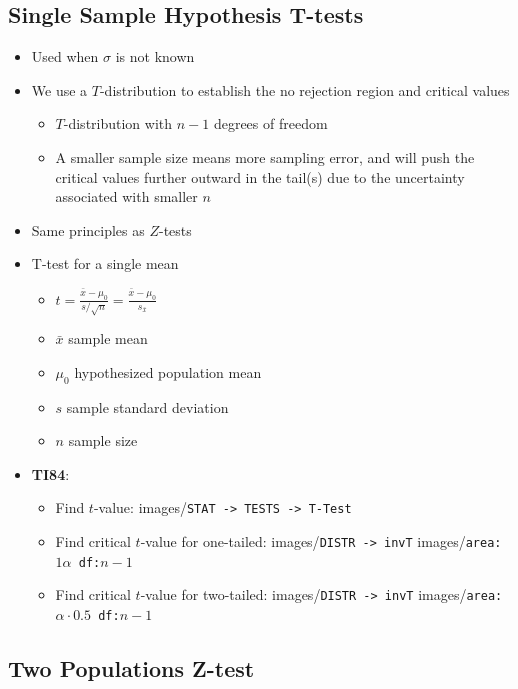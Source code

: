 \documentclass{article}
\newcommand{\code}[1]{images/\colorbox{light-gray}{\texttt{#1}}}
\begin{document}
\subsection{Single Sample Hypothesis T-tests}

\begin{itemize}
    \item Used when $\sigma$ is not known
    \item We use a $T$-distribution to establish the no rejection region and critical values
    \begin{itemize}
        \item $T$-distribution with $n-1$ degrees of freedom
        \item A smaller sample size means more sampling error, and will push the critical values further outward in the tail(s) due to the uncertainty associated with smaller $n$
    \end{itemize}
    \item Same principles as $Z$-tests
    \item T-test for a single mean
    \begin{itemize}
        \item $t=\frac{\bar{x} - \mu_0}{s / \sqrt{n}}=\frac{\bar{x} - \mu_0}{s_{\bar{x}}}$
        \item $\bar{x}$ sample mean
        \item $\mu_0$ hypothesized population mean
        \item $s$ sample standard deviation
        \item $n$ sample size
    \end{itemize}
    \item \textbf{TI84}:
    \begin{itemize}
        \item Find $t$-value: \code{STAT -> TESTS -> T-Test}
        \item Find critical $t$-value for one-tailed: \code{DISTR -> invT} \code{area:$1\alpha$ df:$n-1$}
        \item Find critical $t$-value for two-tailed: \code{DISTR -> invT} \code{area:$\alpha \cdot 0.5$ df:$n-1$}
    \end{itemize}
\end{itemize}

\subsection{Two Populations Z-test}
\end{document}
